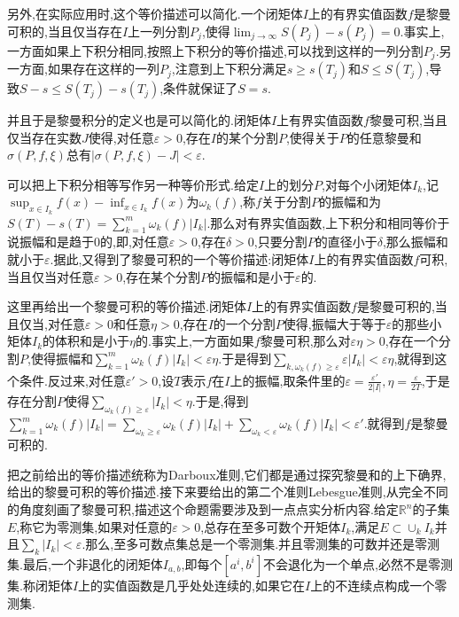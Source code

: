 另外,在实际应用时,这个等价描述可以简化.一个闭矩体$I$上的有界实值函数$f$是黎曼可积的,当且仅当存在$I$上一列分割$P_j$,使得$\lim_{j\to\infty}S(P_j)-s(P_j)=0$.事实上,一方面如果上下积分相同,按照上下积分的等价描述,可以找到这样的一列分割$P_j$.另一方面,如果存在这样的一列$P_j$,注意到上下积分满足$s\ge s(T_j)$和$S\le S(T_j)$,导致$S-s\le S(T_j)-s(T_j)$,条件就保证了$S=s$.

并且于是黎曼积分的定义也是可以简化的.闭矩体$I$上有界实值函数$f$黎曼可积,当且仅当存在实数$J$使得,对任意$\varepsilon>0$,存在$I$的某个分割$P$,使得关于$P$的任意黎曼和$\sigma(P,f,\xi)$总有$\left|\sigma(P,f,\xi)-J\right|<\varepsilon$.

可以把上下积分相等写作另一种等价形式.给定$I$上的划分$P$,对每个小闭矩体$I_k$,记$\sup_{x\in I_k}f(x)-\inf_{x\in I_k}f(x)$为$\omega_k(f)$,称$f$关于分割$P$的振幅和为$S(T)-s(T)=\sum_{k=1}^{m}\omega_k(f)|I_k|$.那么对有界实值函数,上下积分和相同等价于说振幅和是趋于0的,即,对任意$\varepsilon>0$,存在$\delta>0$,只要分割$P$的直径小于$\delta$,那么振幅和就小于$\varepsilon$.据此,又得到了黎曼可积的一个等价描述:闭矩体$I$上的有界实值函数$f$可积,当且仅当对任意$\varepsilon>0$,存在某个分割$P$的振幅和是小于$\varepsilon$的.

这里再给出一个黎曼可积的等价描述.闭矩体$I$上的有界实值函数$f$是黎曼可积的,当且仅当,对任意$\varepsilon>0$和任意$\eta>0$,存在$I$的一个分割$P$使得,振幅大于等于$\varepsilon$的那些小矩体$I_k$的体积和是小于$\eta$的.事实上,一方面如果$f$黎曼可积,那么对$\varepsilon\eta>0$,存在一个分割$P$,使得振幅和$\sum_{k=1}^{m}\omega_k(f)|I_k|<\varepsilon\eta$.于是得到$\sum_{k,\omega_k(f)\ge\varepsilon}\varepsilon|I_k|<\varepsilon\eta$,就得到这个条件.反过来,对任意$\varepsilon'>0$,设$T$表示$f$在$I$上的振幅,取条件里的$\varepsilon=\frac{\varepsilon'}{2|I|},\eta=\frac{\varepsilon
}{2T}$,于是存在分割$P$使得$\sum_{\omega_k(f)\ge\varepsilon}|I_k|<\eta$.于是,得到$\sum_{k=1}^{m}\omega_k(f)|I_k|=\sum_{\omega_k\ge\varepsilon}\omega_k(f)|I_k|+\sum_{\omega_k<\varepsilon}\omega_k(f)|I_k|
<\varepsilon'$.就得到$f$是黎曼可积的.

把之前给出的等价描述统称为Darboux准则,它们都是通过探究黎曼和的上下确界,给出的黎曼可积的等价描述.接下来要给出的第二个准则Lebesgue准则,从完全不同的角度刻画了黎曼可积,描述这个命题需要涉及到一点点实分析内容.给定$\mathbb{R}^n$的子集$E$,称它为零测集,如果对任意的$\varepsilon>0$,总存在至多可数个开矩体$I_k$,满足$E\subset\cup_kI_k$并且$\sum_k|I_k|<\varepsilon$.那么,至多可数点集总是一个零测集.并且零测集的可数并还是零测集.最后,一个非退化的闭矩体$I_{a,b}$,即每个$[a^i,b^i]$不会退化为一个单点,必然不是零测集.称闭矩体$I$上的实值函数是几乎处处连续的,如果它在$I$上的不连续点构成一个零测集.

